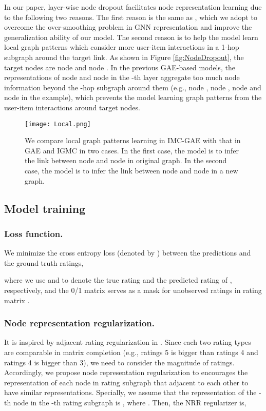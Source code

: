 \documentclass[sigconf]{acmart}
\begin{document}
In our paper, layer-wise node dropout facilitates node representation learning due to the following two reasons. 
The first reason is the same as \cite{berg2017graph}, which we adopt to overcome the over-smoothing problem in GNN representation and improve the generalization ability of our model. 
The second reason is to help the model learn local graph patterns which consider more user-item interactions in a 1-hop subgraph around the target link. As shown in Figure \ref{fig:NodeDropout}, the target nodes are node  and node . In the previous GAE-based models, the representations of node  and node  in the -th layer aggregate too much node information beyond the -hop subgraph around them (e.g., node , node , node  and node  in the example), which prevents the model learning graph patterns from the user-item interactions around target nodes. 
\begin{figure*}[tp]
    \centering\texttt{[image: Local.png]}
    \caption{We compare local graph patterns learning in IMC-GAE with that in GAE and IGMC in two cases. In the first case, the model is to infer the link between node  and node  in original graph. In the second case, the model is to infer the link between node  and node  in a new graph.}
    \label{fig:Discuss}
\end{figure*}
\subsection{Model training}
\subsubsection{Loss function.} We minimize the cross entropy loss (denoted by ) between the predictions and the ground truth ratings,

where we use  and  to denote the true rating and the predicted rating of , respectively, and the 0/1 matrix  serves as a mask for unobserved ratings in rating matrix . 

\subsubsection{Node representation regularization.} 
It is inspired by adjacent rating regularization in \cite{zhang2019inductive}. 
Since each two rating types are comparable in matrix completion (e.g., ratings 5 is bigger than ratings 4 and ratings 4 is bigger than 3), we need to consider the magnitude of ratings. Accordingly,  we propose node representation regularization to encourages the representation of each node in rating subgraph that adjacent to each other to have similar representations. 
Specially, we assume that the representation of the -th node in the -th rating subgraph is , where . 
Then, the NRR regularizer is,
\end{document}

